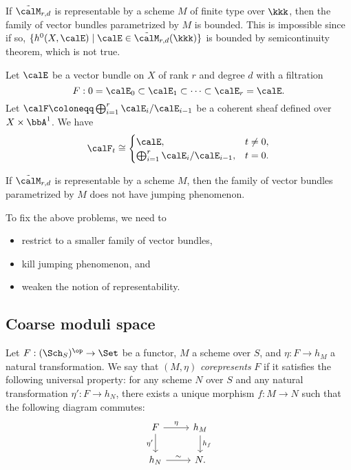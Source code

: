     If \(\tilde{\calM}_{r,d}\) is representable by a scheme \(M\) of finite type over \(\kkk\), then the family of vector bundles parametrized by \(M\) is bounded.
    This is impossible since if so, \(\{h^0(X,\calE) \mid \calE \in \tilde{\calM}_{r,d}(\kkk)\}\) is bounded by semicontinuity theorem, which is not true.

    \begin{example}\label{eg:Roes_construction}
        Let \(\calE\) be a vector bundle on \(X\) of rank \(r\) and degree \(d\) with a filtration
        \[F: 0 = \calE_0 \subset \calE_1 \subset \cdots \subset \calE_r = \calE. \]
        Let \(\calF \coloneqq \bigoplus_{i=1}^r \calE_i/\calE_{i-1}\) be a coherent sheaf defined over \(X \times \bbA^1\).
        We have 
        \[ \calF_t \cong \begin{cases}
            \calE, & t \neq 0, \\
            \bigoplus_{i=1}^r \calE_i/\calE_{i-1}, & t = 0.
        \end{cases} \]
        
    \end{example}

    If \(\tilde{\calM}_{r,d}\) is representable by a scheme \(M\), then the family of vector bundles parametrized by \(M\) does not have jumping phenomenon.

    To fix the above problems, we need to 
    \begin{itemize}
        \item restrict to a smaller family of vector bundles,
        \item kill jumping phenomenon, and
        \item weaken the notion of representability.
    \end{itemize}

\subsection{Coarse moduli space}

    Let \(F : (\Sch_S)^{\op} \to \Set\) be a functor, \(M\) a scheme over \(S\), and \(\eta : F \to h_M\) a natural transformation.
    We say that \((M, \eta)\) \emph{corepresents} \(F\) if it satisfies the following universal property: 
    for any scheme \(N\) over \(S\) and any natural transformation \(\eta' : F \to h_N\), there exists a unique morphism \(f : M \to N\) such that the following diagram commutes:
    \[
    \begin{tikzcd}
        F \arrow[r, "\eta"] \arrow[d, "\eta'"'] & h_M \arrow[d, "h_f"] \\
        h_N \arrow[r, "\sim"] & N.
    \end{tikzcd}
    \]

